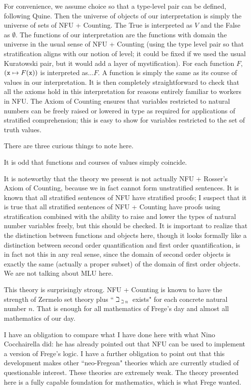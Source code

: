 \documentclass[12pt]{article}
\begin{document}
For convenience, we assume choice so that a type-level pair can be defined, following Quine.  Then the universe of objects of our interpretation is simply the universe of sets of NFU + Counting.   The True is interpreted as $V$ and the False as $\emptyset$.  The functions of our interpretation are the functions with domain the universe in the usual sense of NFU + Counting (using the type level pair so that stratification aligns with our notion of level;  it could be fixed if we used the usual Kuratowski pair, but it would add a layer of mystification).
For each function $F$, $({\tt x} \mapsto F({\tt x}))$ is interpreted as...$F$.  A function is simply the same as its course of values in our interpretation.  It is then completely straightforward to check that
all the axioms hold in this interpretation for reasons entirely familiar to workers in NFU.  The Axiom of Counting ensures that variables restricted to natural numbers can be freely raised or lowered in type
as required for applications of stratified comprehension;  this is easy to show for variables restricted to the set of truth values.

There are three curious things to note here.

It is odd that functions and courses of values simply coincide.

It is noteworthy that the theory we present is not actually NFU + Rosser's Axiom of Counting, because we in fact cannot form unstratified sentences.  It is known that all stratified sentences of NFU have stratified proofs;
I suspect that it is true that all stratified sentences of NFU + Counting have proofs using stratification combined with the ability to raise and lower the types of natural number variables freely, but this should be checked.
It is important to realize that the distinction between functions and objects here, though it looks formally like a distinction between second order quantification and first order quantification, is in fact not this in any real sense, since the domain of second order objects is exactly the same (actually a proper subset) of the domain of first order objects.  We are not talking about MLU here.

This theory is surprisingly strong.  NFU + Counting is known to have the strength of Zermelo set theory plus ``$\beth_{\beth n}$ exists" for each concrete natural number $n$.  That is enough for all mathematics of Frege's day and almost all mathematics of our day.

I have an obligation to compare what I have done here with what Nino Cocchairella did:  he has already pointed out that NFU can be used to implement a version of Frege's logic.  I have a further obligation to point out that this development makes other ``neo-Fregean" theories which are currently studied of questionable interest.  These theories are extremely weak.  The theory presented here is a fully capable foundation for mathematics, which is what Frege wanted.
\end{document}

